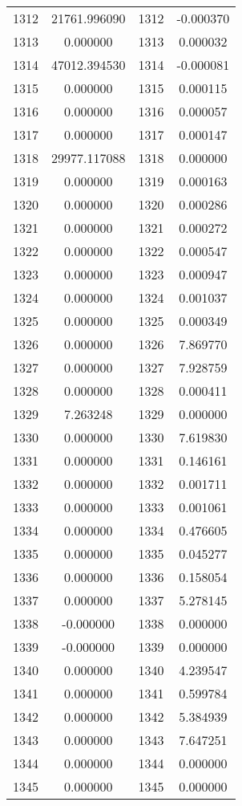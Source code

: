 \documentclass[12pt]{article}
\begin{document}
\begin{longtable}{@{}cccc@{}}
1312 & 21761.996090 & 1312 & -0.000370 \\
1313 & 0.000000 & 1313 & 0.000032 \\
1314 & 47012.394530 & 1314 & -0.000081 \\
1315 & 0.000000 & 1315 & 0.000115 \\
1316 & 0.000000 & 1316 & 0.000057 \\
1317 & 0.000000 & 1317 & 0.000147 \\
1318 & 29977.117088 & 1318 & 0.000000 \\
1319 & 0.000000 & 1319 & 0.000163 \\
1320 & 0.000000 & 1320 & 0.000286 \\
1321 & 0.000000 & 1321 & 0.000272 \\
1322 & 0.000000 & 1322 & 0.000547 \\
1323 & 0.000000 & 1323 & 0.000947 \\
1324 & 0.000000 & 1324 & 0.001037 \\
1325 & 0.000000 & 1325 & 0.000349 \\
1326 & 0.000000 & 1326 & 7.869770 \\
1327 & 0.000000 & 1327 & 7.928759 \\
1328 & 0.000000 & 1328 & 0.000411 \\
1329 & 7.263248 & 1329 & 0.000000 \\
1330 & 0.000000 & 1330 & 7.619830 \\
1331 & 0.000000 & 1331 & 0.146161 \\
1332 & 0.000000 & 1332 & 0.001711 \\
1333 & 0.000000 & 1333 & 0.001061 \\
1334 & 0.000000 & 1334 & 0.476605 \\
1335 & 0.000000 & 1335 & 0.045277 \\
1336 & 0.000000 & 1336 & 0.158054 \\
1337 & 0.000000 & 1337 & 5.278145 \\
1338 & -0.000000 & 1338 & 0.000000 \\
1339 & -0.000000 & 1339 & 0.000000 \\
1340 & 0.000000 & 1340 & 4.239547 \\
1341 & 0.000000 & 1341 & 0.599784 \\
1342 & 0.000000 & 1342 & 5.384939 \\
1343 & 0.000000 & 1343 & 7.647251 \\
1344 & 0.000000 & 1344 & 0.000000 \\
1345 & 0.000000 & 1345 & 0.000000 \\

\end{longtable}
\end{document}
